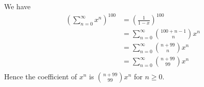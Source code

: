 We have
\begin{align*}
\left( \sum_{n=0}^\infty x^n \right)^{100} 
&= \left( \frac{1}{1 - x} \right)^{100} \\
&= \sum_{n=0}^\infty \binom{100 + n - 1}{n} x^n \\
&= \sum_{n=0}^\infty \binom{n + 99}{n} x^n \\
&= \sum_{n=0}^\infty \binom{n + 99}{99} x^n \\
\end{align*}
Hence the coefficient of $x^n$ is $\binom{n + 99}{99} x^n$ for $n \geq 0$.
